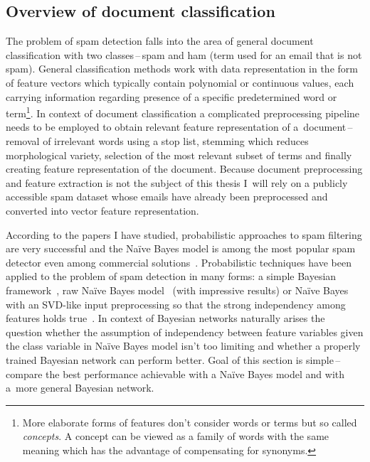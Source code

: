 \documentclass[english,cover]{fitthesis} %
\newcommand{\term}[1]{\emph{#1}}           %
\begin{document}
\subsection{Overview of document classification}
The problem of spam detection falls into the area of general document classification with two classes\,--\,spam and ham (term used for an email that is not spam). General classification methods work with data representation in the form of feature vectors which typically contain polynomial or continuous values, each carrying information regarding presence of a specific predetermined word or term\footnote{More elaborate forms of features don't consider words or terms but so called \term{concepts}. A concept can be viewed as a family of words with the same meaning which has the advantage of compensating for synonyms.}. In context of document classification a complicated preprocessing pipeline needs to be employed to obtain relevant feature representation of a~document\,--\,removal of irrelevant words using a stop list, stemming which reduces morphological variety, selection of the most relevant subset of terms and finally creating feature representation of the document. Because document preprocessing and feature extraction is not the subject of this thesis I~will rely on a publicly accessible spam dataset whose emails have already been preprocessed and converted into vector feature representation.

According to the papers I have studied, probabilistic approaches to spam filtering are very successful and the Naïve Bayes model is among the most popular spam detector even among commercial solutions~\cite{blanzieri09}. Probabilistic techniques have been applied to the problem of spam detection in many forms: a simple Bayesian framework~\cite{isaac09}, raw Naïve Bayes model~\cite{heckerman98_spam} (with impressive results) or Naïve Bayes with an SVD-like input preprocessing so that the strong independency among features holds true~\cite{renuka11}. In context of Bayesian networks naturally arises the question whether the assumption of independency between feature variables given the class variable in Naïve Bayes model isn't too limiting and whether a properly trained Bayesian network can perform better. Goal of this section is simple\,--\,compare the best performance achievable with a Naïve Bayes model and with a~more general Bayesian network.
\end{document}
